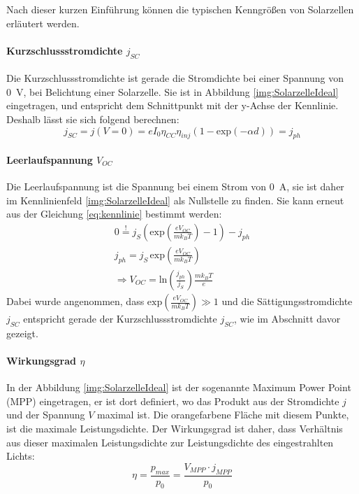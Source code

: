 \documentclass[12pt,a4paper,ngerman]{report}
\begin{document}
	Nach dieser kurzen Einführung können die typischen Kenngrößen von Solarzellen erläutert werden.

	\paragraph{Kurzschlussstromdichte $j_{SC}$}
	Die Kurzschlussstromdichte ist gerade die Stromdichte bei einer Spannung von \SI{0}{\volt}, bei Belichtung einer Solarzelle. Sie ist in Abbildung \ref{img:SolarzelleIdeal} eingetragen, und entspricht dem Schnittpunkt mit der y-Achse der Kennlinie. Deshalb lässt sie sich folgend berechnen:
	\begin{equation}
		j_{SC} = j(V = 0) = e I_0 \eta_{CC} \eta_{inj} (1-\text{exp}(-\alpha d)) = j_{ph}
	\end{equation}
	\paragraph{Leerlaufspannung $V_{OC}$}
	Die Leerlaufspannung ist die Spannung bei einem Strom von \SI{0}{\ampere}, sie ist daher im Kennlinienfeld \ref{img:SolarzelleIdeal} als Nullstelle zu finden. Sie kann erneut aus der Gleichung \ref{eq:kennlinie} bestimmt werden:
	\begin{equation}
		\begin{split}
			 0 \overset{!}{=}  j_S \left(\text{exp}\left(\frac{e V_{OC}}{m k_B T}\right) - 1\right) - j_{ph}  \\
			 j_{ph} = j_S \, \text{exp}\left(\frac{e V_{OC}}{m k_B T}\right) \\
			 \Rightarrow V_{OC} = \text{ln} \left( \frac{j_{ph}}{j_S}\right) \frac{m k_B T}{e}
		\end{split}
	\end{equation} 
	Dabei wurde angenommen, dass $\text{exp}\left(\frac{e V_{OC}}{m k_B T}\right) \gg 1 $ und die Sättigungsstromdichte $j_{SC}$ entspricht gerade der Kurzschlussstromdichte $j_{SC}$, wie im Abschnitt davor gezeigt.
	\paragraph{Wirkungsgrad $\eta$}
	In der Abbildung \ref{img:SolarzelleIdeal} ist der sogenannte Maximum Power Point (MPP) eingetragen, er ist dort definiert, wo das Produkt aus der Stromdichte $j$ und der Spannung $V$ maximal ist. Die orangefarbene Fläche mit diesem Punkte, ist die maximale Leistungsdichte. Der Wirkungsgrad ist daher, dass Verhältnis aus dieser maximalen Leistungsdichte zur Leistungsdichte des eingestrahlten Lichts:
	\begin{equation}
		\eta = \frac{p_{max}}{p_0} = \frac{V_{MPP} \cdot j_{MPP}}{p_0}
	\end{equation}
\end{document}
